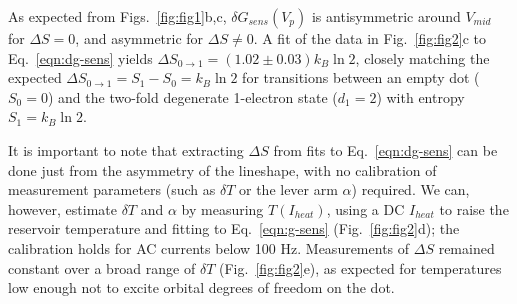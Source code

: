 \documentclass[twocolumn,showpacs,amsmath,amssymb,prl,aps,superscriptaddress]{revtex4-1}
\begin{document}
\noindent As expected  from Figs.~\ref{fig:fig1}b,c, $\delta G_{sens}(V_p)$ is antisymmetric around $V_{mid}$ for $\Delta S=0$, and asymmetric for $\Delta S\neq 0$.  A fit of the data in Fig.~\ref{fig:fig2}c to Eq.~\ref{eqn:dg-sens} yields $\Delta S_{0\rightarrow 1}=(1.02 \pm 0.03) k_B \ln{2}$, closely matching the expected $\Delta S_{0 \rightarrow 1} = S_1 - S_0 =k_B\ln{2}$ for transitions between an empty dot ($S_0=0$) and the two-fold degenerate 1-electron state ($d_1=2$) with entropy $S_1=k_B \ln{2}$.

It is important to note that extracting $\Delta S$ from fits to Eq.~\ref{eqn:dg-sens} can be done just from the asymmetry of the lineshape, with no calibration of measurement parameters (such as $\delta T$ or the lever arm $\alpha$) required.  We can, however, estimate $\delta T$ and $\alpha$ by measuring $T(I_{heat})$, using a DC $I_{heat}$ to raise the reservoir temperature and fitting to Eq.~\ref{eqn:g-sens}  (Fig.~\ref{fig:fig2}d); the calibration holds for AC currents below 100 Hz.  Measurements of $\Delta S$ remained constant over a broad range of $\delta T$ (Fig.~\ref{fig:fig2}e), as expected for temperatures low enough not to excite orbital degrees of freedom on the dot. 
\end{document}
